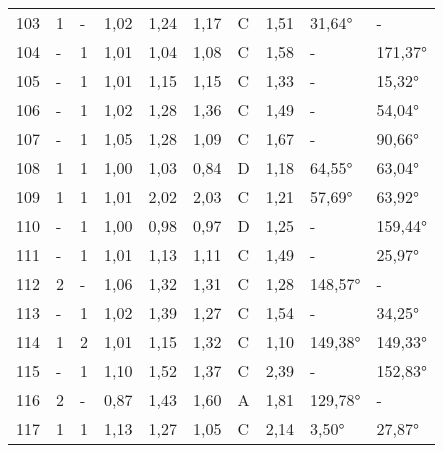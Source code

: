 \begin{longtable}{p{0.7cm}p{1.4cm}p{1.4cm}p{1cm}p{1cm}p{1cm}p{1cm}p{1cm}p{1cm}p{1cm}}
\small{103} & \small{1} & \small{-} & \small{1,02} & \small{1,24} & \small{1,17} & \small{C} & \small{1,51} & \small{31,64°} & \small{-}\\
\small{104} & \small{-} & \small{1} & \small{1,01} & \small{1,04} & \small{1,08} & \small{C} & \small{1,58} & \small{-} & \small{171,37°}\\
\small{105} & \small{-} & \small{1} & \small{1,01} & \small{1,15} & \small{1,15} & \small{C} & \small{1,33} & \small{-} & \small{15,32°}\\
\small{106} & \small{-} & \small{1} & \small{1,02} & \small{1,28} & \small{1,36} & \small{C} & \small{1,49} & \small{-} & \small{54,04°}\\
\small{107} & \small{-} & \small{1} & \small{1,05} & \small{1,28} & \small{1,09} & \small{C} & \small{1,67} & \small{-} & \small{90,66°}\\
\small{108} & \small{1} & \small{1} & \small{1,00} & \small{1,03} & \small{0,84} & \small{D} & \small{1,18} & \small{64,55°} & \small{63,04°}\\
\small{109} & \small{1} & \small{1} & \small{1,01} & \small{2,02} & \small{2,03} & \small{C} & \small{1,21} & \small{57,69°} & \small{63,92°}\\
\small{110} & \small{-} & \small{1} & \small{1,00} & \small{0,98} & \small{0,97} & \small{D} & \small{1,25} & \small{-} & \small{159,44°}\\
\small{111} & \small{-} & \small{1} & \small{1,01} & \small{1,13} & \small{1,11} & \small{C} & \small{1,49} & \small{-} & \small{25,97°}\\
\small{112} & \small{2} & \small{-} & \small{1,06} & \small{1,32} & \small{1,31} & \small{C} & \small{1,28} & \small{148,57°} & \small{-}\\
\small{113} & \small{-} & \small{1} & \small{1,02} & \small{1,39} & \small{1,27} & \small{C} & \small{1,54} & \small{-} & \small{34,25°}\\
\small{114} & \small{1} & \small{2} & \small{1,01} & \small{1,15} & \small{1,32} & \small{C} & \small{1,10} & \small{149,38°} & \small{149,33°}\\
\small{115} & \small{-} & \small{1} & \small{1,10} & \small{1,52} & \small{1,37} & \small{C} & \small{2,39} & \small{-} & \small{152,83°}\\
\small{116} & \small{2} & \small{-} & \small{0,87} & \small{1,43} & \small{1,60} & \small{A} & \small{1,81} & \small{129,78°} & \small{-}\\
\small{117} & \small{1} & \small{1} & \small{1,13} & \small{1,27} & \small{1,05} & \small{C} & \small{2,14} & \small{3,50°} & \small{27,87°}\\

\end{longtable}
